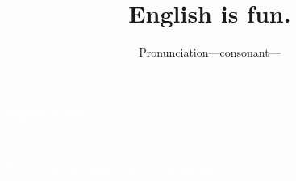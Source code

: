 \documentclass[aspectratio=169,xcolor={dvipsnames,table}]{beamer}
\title{English is fun.}
\subtitle{Pronunciation---consonant---}
\author{}
\institute[]{}
\date[]
\makeatletter
\newcommand*{\themonth}{\two@digits\month}
\newcommand*{\theday}{\two@digits\day}
\newcommand{\mytoday}{{\the\year}--{\themonth}--{\theday}}
\makeatother
\begin{document}
\begin{frame}
\raggedleft
  \textcolor{white}{\Huge\bfseries English is fun.}

\vfill

\raggedleft
 \textcolor{white}{\LARGE\bfseries \mytoday}

\vfill
\vfill
\vfill

\raggedleft
\textcolor{white}{\large The lesson will begin at the scheduled time.}

\end{frame}
\end{document}
